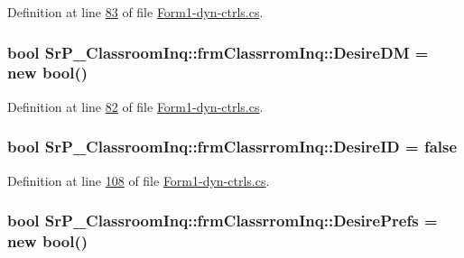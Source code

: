 \-Definition at line \hyperlink{_form1-dyn-ctrls_8cs_source_l00083}{83} of file \hyperlink{_form1-dyn-ctrls_8cs_source}{\-Form1-\/dyn-\/ctrls.\-cs}.

\hypertarget{class_sr_p___classroom_inq_1_1frm_classrrom_inq_a8f8f9bb905b290fa448b445560458f89}{
\subsubsection[{\-Desire\-D\-M}]{\setlength{\rightskip}{0pt plus 5cm}bool {\bf \-Sr\-P\-\_\-\-Classroom\-Inq\-::frm\-Classrrom\-Inq\-::\-Desire\-D\-M} = new bool()}}
\label{class_sr_p___classroom_inq_1_1frm_classrrom_inq_a8f8f9bb905b290fa448b445560458f89}


\-Definition at line \hyperlink{_form1-dyn-ctrls_8cs_source_l00082}{82} of file \hyperlink{_form1-dyn-ctrls_8cs_source}{\-Form1-\/dyn-\/ctrls.\-cs}.

\hypertarget{class_sr_p___classroom_inq_1_1frm_classrrom_inq_aad36cc9a93fb79969dd3b0d0fe52b793}{
\subsubsection[{\-Desire\-I\-D}]{\setlength{\rightskip}{0pt plus 5cm}bool {\bf \-Sr\-P\-\_\-\-Classroom\-Inq\-::frm\-Classrrom\-Inq\-::\-Desire\-I\-D} = false}}
\label{class_sr_p___classroom_inq_1_1frm_classrrom_inq_aad36cc9a93fb79969dd3b0d0fe52b793}


\-Definition at line \hyperlink{_form1-dyn-ctrls_8cs_source_l00108}{108} of file \hyperlink{_form1-dyn-ctrls_8cs_source}{\-Form1-\/dyn-\/ctrls.\-cs}.

\hypertarget{class_sr_p___classroom_inq_1_1frm_classrrom_inq_a263bbbace2f9c25e5f92573e5f4845ba}{
\subsubsection[{\-Desire\-Prefs}]{\setlength{\rightskip}{0pt plus 5cm}bool {\bf \-Sr\-P\-\_\-\-Classroom\-Inq\-::frm\-Classrrom\-Inq\-::\-Desire\-Prefs} = new bool()}}
\label{class_sr_p___classroom_inq_1_1frm_classrrom_inq_a263bbbace2f9c25e5f92573e5f4845ba}


